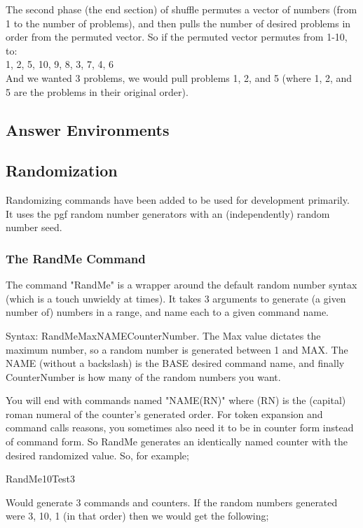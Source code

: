 \documentclass{ximera}
\begin{document}
The second phase (the end section) of shuffle permutes a vector of numbers (from 1 to the number of problems), and then pulls the number of desired problems in order from the permuted vector. So if the permuted vector permutes from 1-10, to:\\
1, 2, 5, 10, 9, 8, 3, 7, 4, 6\\
And we wanted 3 problems, we would pull problems 1, 2, and 5 (where 1, 2, and 5 are the problems in their original order).

\subsection{Answer Environments}

\subsection{Randomization}
Randomizing commands have been added to be used for development primarily. It uses the pgf random number generators with an (independently) random number seed.

\subsubsection{The RandMe Command}
The command "RandMe" is a wrapper around the default random number syntax (which is a touch unwieldy at times). It takes 3 arguments to generate (a given number of) numbers in a range, and name each to a given command name.

Syntax: RandMe{Max}{NAME}{CounterNumber}. The Max value dictates the maximum number, so a random number is generated between 1 and MAX. The NAME (without a backslash) is the BASE desired command name, and finally CounterNumber is how many of the random numbers you want.

You will end with commands named "NAME(RN)" where (RN) is the (capital) roman numeral of the counter's generated order. 
For token expansion and command calls reasons, you sometimes also need it to be in counter form instead of command form. So RandMe generates an identically named counter with the desired randomized value.
So, for example;

RandMe{10}{Test}{3} 

Would generate 3 commands and counters. If the random numbers generated were 3, 10, 1 (in that order) then we would get the following;

\newcommand{\TestI}{3}
\setcounter{TestI}{3}
\end{document}
